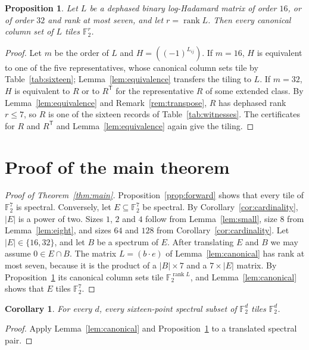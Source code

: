 \documentclass[11pt]{amsart}
\newtheorem{proposition}[theorem]{Proposition}
\newtheorem{corollary}[theorem]{Corollary}
\theoremstyle{definition}
\theoremstyle{remark}
\numberwithin{equation}{section}
\numberwithin{table}{section}
\newcommand{\F}{\mathbb{F}}
\newcommand{\rank}{\operatorname{rank}}
\newcommand{\T}{\mathsf{T}}
\begin{document}
\begin{proposition}\label{prop:smallrank}
Let $L$ be a dephased binary log-Hadamard matrix of order $16$, or of order $32$ and rank at most seven, and let $r=\rank L$. Then every canonical column set of $L$ tiles $\F_2^r$.
\end{proposition}

\begin{proof}
Let $m$ be the order of $L$ and $H=((-1)^{L_{ij}})$. If $m=16$, $H$ is equivalent to one of the five representatives, whose canonical column sets tile by Table~\ref{tab:sixteen}; Lemma~\ref{lem:equivalence} transfers the tiling to $L$. If $m=32$, $H$ is equivalent to $R$ or to $R^{\T}$ for the representative $R$ of some extended class. By Lemma~\ref{lem:equivalence} and Remark~\ref{rem:transpose}, $R$ has dephased rank $r\le7$, so $R$ is one of the sixteen records of Table~\ref{tab:witnesses}. The certificates for $R$ and $R^{\T}$ and Lemma~\ref{lem:equivalence} again give the tiling.
\end{proof}

\section{Proof of the main theorem}\label{sec:proof}

\begin{proof}[Proof of Theorem~\ref{thm:main}]
Proposition~\ref{prop:forward} shows that every tile of $\F_2^7$ is spectral. Conversely, let $E\subseteq\F_2^7$ be spectral. By Corollary~\ref{cor:cardinality}, $|E|$ is a power of two. Sizes $1$, $2$ and $4$ follow from Lemma~\ref{lem:small}, size $8$ from Lemma~\ref{lem:eight}, and sizes $64$ and $128$ from Corollary~\ref{cor:cardinality}. Let $|E|\in\{16,32\}$, and let $B$ be a spectrum of $E$. After translating $E$ and $B$ we may assume $0\in E\cap B$. The matrix $L=(b\cdot e)$ of Lemma~\ref{lem:canonical} has rank at most seven, because it is the product of a $|B|\times7$ and a $7\times|E|$ matrix. By Proposition~\ref{prop:smallrank} its canonical column sets tile $\F_2^{\rank L}$, and Lemma~\ref{lem:canonical} shows that $E$ tiles $\F_2^7$.
\end{proof}

\begin{corollary}\label{cor:sixteen}
For every $d$, every sixteen-point spectral subset of $\F_2^d$ tiles $\F_2^d$.
\end{corollary}

\begin{proof}
Apply Lemma~\ref{lem:canonical} and Proposition~\ref{prop:smallrank} to a translated spectral pair.
\end{proof}
\end{document}
